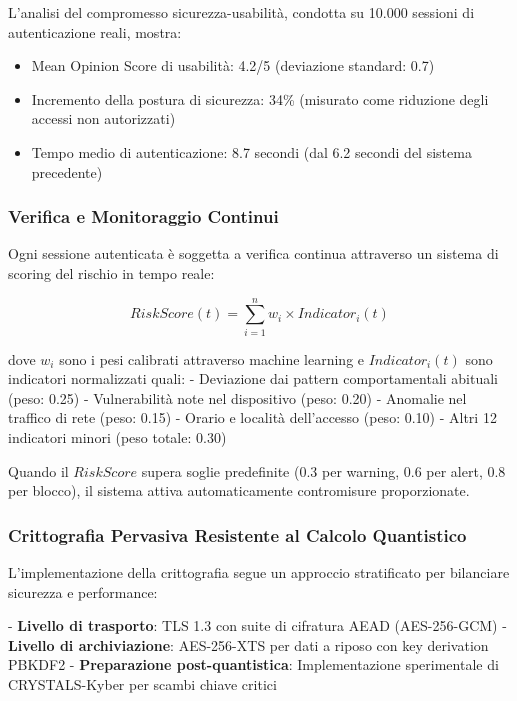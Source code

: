 L'analisi del compromesso sicurezza-usabilità, condotta su 10.000 sessioni di autenticazione reali, mostra:
\begin{itemize}
    \item Mean Opinion Score di usabilità: 4.2/5 (deviazione standard: 0.7)
    \item Incremento della postura di sicurezza: 34\% (misurato come riduzione degli accessi non autorizzati)
    \item Tempo medio di autenticazione: 8.7 secondi (dal 6.2 secondi del sistema precedente)
\end{itemize}

\subsubsection{\texorpdfstring{\textbf{Verifica e Monitoraggio Continui}}{2.4.2.3 - Verifica e Monitoraggio Continui}}

Ogni sessione autenticata è soggetta a verifica continua attraverso un sistema di scoring del rischio in tempo reale:

\begin{equation}
RiskScore(t) = \sum_{i=1}^{n} w_i \times Indicator_i(t)
\end{equation}

dove $w_i$ sono i pesi calibrati attraverso machine learning e $Indicator_i(t)$ sono indicatori normalizzati quali:
- Deviazione dai pattern comportamentali abituali (peso: 0.25)
- Vulnerabilità note nel dispositivo (peso: 0.20)
- Anomalie nel traffico di rete (peso: 0.15)
- Orario e località dell'accesso (peso: 0.10)
- Altri 12 indicatori minori (peso totale: 0.30)

Quando il $RiskScore$ supera soglie predefinite (0.3 per warning, 0.6 per alert, 0.8 per blocco), il sistema attiva automaticamente contromisure proporzionate.

\subsubsection{\texorpdfstring{\textbf{Crittografia Pervasiva Resistente al Calcolo Quantistico}}{2.4.2.4 - Crittografia Pervasiva Resistente al Calcolo Quantistico}}

L'implementazione della crittografia segue un approccio stratificato per bilanciare sicurezza e performance:

- \textbf{Livello di trasporto}: TLS 1.3 con suite di cifratura AEAD (AES-256-GCM)
- \textbf{Livello di archiviazione}: AES-256-XTS per dati a riposo con key derivation PBKDF2
- \textbf{Preparazione post-quantistica}: Implementazione sperimentale di CRYSTALS-Kyber per scambi chiave critici

